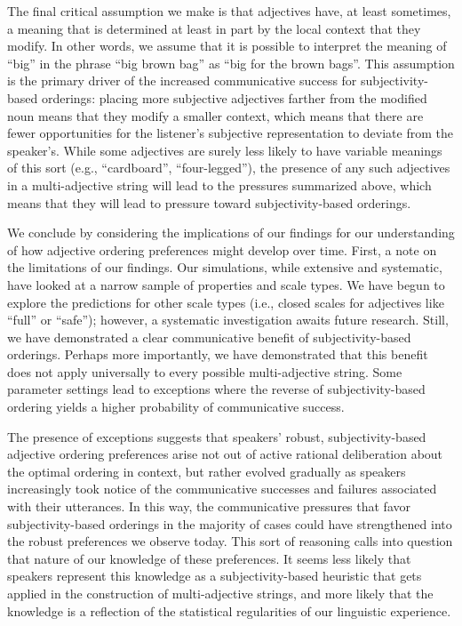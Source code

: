 \documentclass[10pt,a4paper]{article}
\begin{document}
The final critical assumption we make is that adjectives have, at least sometimes, a meaning that is determined at least in part by the local context that they modify. In other words, we assume that it is possible to interpret the meaning of ``big''  in the phrase ``big brown bag'' as ``big for the brown bags''. This assumption is the primary driver of the increased communicative success for subjectivity-based orderings: placing more subjective adjectives farther from the modified noun means that they modify a smaller context, which means that there are fewer opportunities for the listener's subjective representation to deviate from the speaker's. While some adjectives are surely less likely to have variable meanings of this sort (e.g., ``cardboard'', ``four-legged''), the presence of any such adjectives in a multi-adjective string will lead to the pressures summarized above, which means that they will lead to pressure toward subjectivity-based orderings.

We conclude by considering the implications of our findings for our understanding of how adjective ordering preferences might develop over time. First, a note on the limitations of our findings. Our simulations, while extensive and systematic, have looked at a narrow sample of properties and scale types. We have begun to explore the predictions for other scale types (i.e., closed scales for adjectives like ``full'' or ``safe''); however, a systematic investigation awaits future research. Still, we have demonstrated a clear communicative benefit of subjectivity-based orderings. Perhaps more importantly, we have demonstrated that this benefit does not apply universally to every possible multi-adjective string. Some parameter settings lead to exceptions where the reverse of subjectivity-based ordering yields a higher probability of communicative success.

The presence of exceptions suggests that speakers' robust, subjectivity-based adjective ordering preferences arise not out of active rational deliberation about the optimal ordering in context, but rather evolved gradually as speakers increasingly took notice of the communicative successes and failures associated with their utterances. In this way, the communicative pressures that favor subjectivity-based orderings in the majority of cases could have strengthened into the robust preferences we observe today. This sort of reasoning calls into question that nature of our knowledge of these preferences. It seems less likely that speakers represent this knowledge as a subjectivity-based heuristic that gets applied in the construction of multi-adjective strings, and more likely that the knowledge is a reflection of the statistical regularities of our linguistic experience.








\setlength{\bibleftmargin}{.125in}
\setlength{\bibindent}{-\bibleftmargin}


\end{document}
